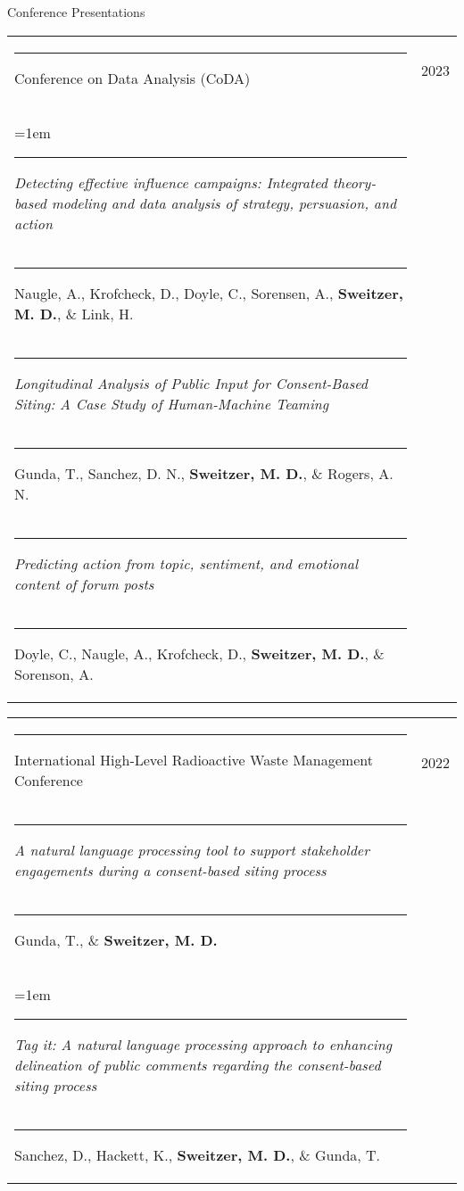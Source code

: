 \documentclass[letterpaper, 10pt]{extarticle}
\begin{document}
\vspace{0.3em}
{\large Conference Presentations}

\vspace{1em}
\begin{tabularx}{\textwidth}{Xr}
\rule{0.5em}{0pt}{\small Conference on Data Analysis (CoDA)} & {\small 2023}\vspace{0.25em}\\
\hangindent=1em\rule{1em}{0pt}{\raggedright \small \textit{Detecting effective influence campaigns: Integrated theory-based modeling and data analysis of strategy, persuasion, and action}}\\
\rule{1.25em}{0pt}{\small Naugle, A., Krofcheck, D., Doyle, C., Sorensen, A., \textbf{Sweitzer, M. D.}, \& Link, H.}\vspace{0.5em}\\
\rule{1em}{0pt}{\raggedright \small \textit{Longitudinal Analysis of Public Input for Consent-Based Siting: A Case Study of Human-Machine Teaming}}\\
\rule{1.25em}{0pt}{\small Gunda, T., Sanchez, D. N., \textbf{Sweitzer, M. D.}, \& Rogers, A. N.}\vspace{0.5em}\\
\rule{1em}{0pt}{\raggedright \small \textit{Predicting action from topic, sentiment, and emotional content of forum posts}}\\
\rule{1.25em}{0pt}{\small Doyle, C., Naugle, A., Krofcheck, D., \textbf{Sweitzer, M. D.}, \& Sorenson, A.}\vspace{0.5em}\\
\end{tabularx}

\vspace{0.5em}
\begin{tabularx}{\textwidth}{Xr}
\rule{0.5em}{0pt}{\small International High-Level Radioactive Waste Management Conference} & {\small 2022}\vspace{0.25em}\\
\rule{1em}{0pt}{\raggedright \small \textit{A natural language processing tool to support stakeholder engagements during a consent-based siting process}}\\
\rule{1.25em}{0pt}{\small Gunda, T., \& \textbf{Sweitzer, M. D.}}\vspace{0.5em}\\
\hangindent=1em\rule{1em}{0pt}{\raggedright \small \textit{Tag it: A natural language processing approach to enhancing delineation of public comments regarding the consent-based siting process}}\\
\rule{1.25em}{0pt}{\small Sanchez, D., Hackett, K., \textbf{Sweitzer, M. D.}, \& Gunda, T.}
\end{tabularx}
\end{document}
